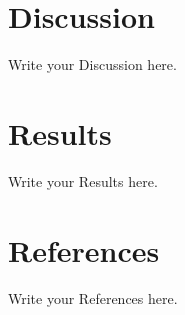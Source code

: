 \documentclass[12pt]{article}
\begin{document}
	\section{Discussion}
	Write your Discussion here.	
	
	\section{Results}
	Write your Results here.
	
	
	\section{References}
	Write your References here.
	
	
\end{document}

